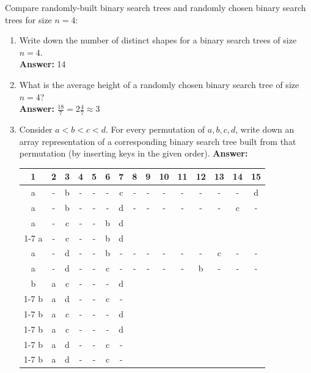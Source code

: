 \documentclass[dvipsnames]{article}
\begin{document}
\begin{enumerate}
\begin{center}
    
    \color{black}

  \clearpage
  \item Compare randomly-built binary search trees and randomly chosen binary search trees for size $n = 4$:
  \begin{enumerate}
    \item Write down the number of distinct shapes for a binary search trees of size $n = 4$.
      \color{blue}\\
      \textbf{Answer:} 14




      
      \color{black}
    \item What is the average height of a randomly chosen binary search tree of size $n = 4$?
    \color{blue}\\
    \textbf{Answer:} $\frac{18}{7} = 2 \frac{4}{7} \approx 3$
    \color{black}
    \item Consider $a < b < c < d$. For every permutation of $a, b, c, d$, write down an array representation of a corresponding
    binary search tree built from that permutation (by inserting keys in the given order).
    \color{blue}
      \textbf{Answer:}


        \begin{tabular}{|c||c|c||c|c|c|c||c|c|c|c|c|c|c|c|}
    \hline
    \textbf{1} & \textbf{2} & \textbf{3} & \textbf{4} & \textbf{5} & \textbf{6} & \textbf{7} & \textbf{8} & \textbf{9} & \textbf{10} & \textbf{11} & \textbf{12} & \textbf{13} & \textbf{14} & \textbf{15} \\
    \hline
    \hline
    a & - & b & - & - & - & c & - & - & - & - & - & - & - & d \\
    \hline
    a & - & b & - & - & - & d & - & - & - & - & - & - & c & - \\
    \hline
    a & - & c & - & - & b & d  \\
    \cline{1-7}
    a & - & c & - & - & b & d  \\
    \hline
    a & - & d & - & - & b & - & - & - & - & - & - & c & - & - \\
    \hline
    a & - & d & - & - & c & - & - & - & - & - & b & - & - & - \\
    
    \hline
    
    b & a & c & - & - & - & d \\
    \cline{1-7}
    b & a & d & - & - & c & - \\
    \cline{1-7}
    b & a & c & - & - & - & d \\
    \cline{1-7}
    b & a & c & - & - & - & d \\
    \cline{1-7}
    b & a & d & - & - & c & - \\
    \cline{1-7}
    b & a & d & - & - & c & - \\
    

\end{tabular}
\end{enumerate}
\end{center}
\end{enumerate}
\end{document}
